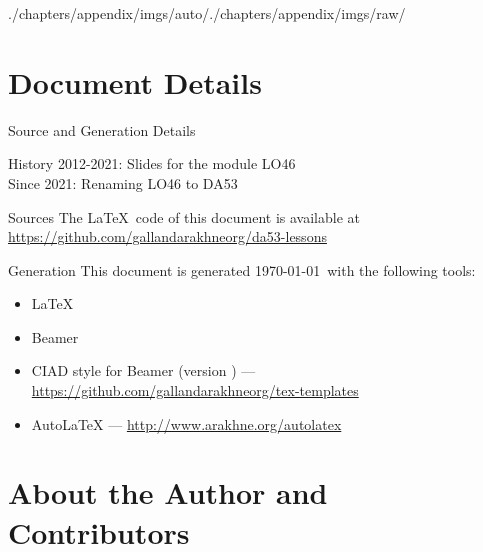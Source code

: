 \begin{graphicspathcontext}{{./chapters/appendix/imgs/auto/}{./chapters/appendix/imgs/raw/}}
\section{Document Details}
\sectiontableofcontentslide

\begin{frame}[t]{Source and Generation Details}
	\begin{smaller}
		\begin{block}{History}
			2012-2021: Slides for the module LO46 \\
			Since 2021: Renaming LO46 to DA53
		\end{block}
		\vspace{.25cm}
		\begin{block}{Sources}
			The \LaTeX\ code of this document is available at \url{https://github.com/gallandarakhneorg/da53-lessons}
		\end{block}
		\vspace{.25cm}
		\begin{block}{Generation}
			This document is generated \today\ with the following tools:
			\begin{itemize}
			\item \LaTeX
			\item Beamer
			\item CIAD style for Beamer (version \insertciadbeamerthemeversion) --- \url{https://github.com/gallandarakhneorg/tex-templates}
			\item AutoLaTeX --- \url{http://www.arakhne.org/autolatex}
			\end{itemize}
		\end{block}
	\end{smaller}
\end{frame}

\section{About the Author and Contributors}
\sectiontableofcontentslide


\end{graphicspathcontext}
